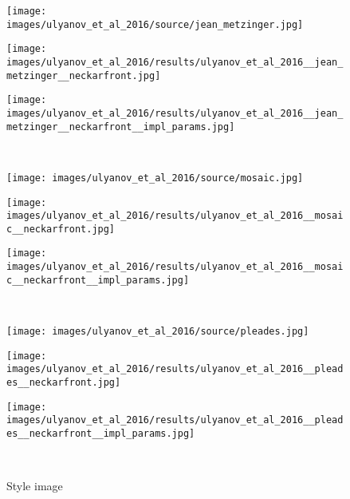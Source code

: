\begin{figure}[H]
\begin{minipage}[t]{0.24\textwidth}
		\texttt{[image: images/ulyanov\_et\_al\_2016/source/jean\_metzinger.jpg]}
	\end{minipage}
	\hfill%
	\begin{minipage}[t]{0.24\textwidth}
		\centering
		\texttt{[image: images/ulyanov\_et\_al\_2016/results/ulyanov\_et\_al\_2016\_\_jean\_metzinger\_\_neckarfront.jpg]}
	\end{minipage}
	\hfill%
	\begin{minipage}[t]{0.24\textwidth}
		\centering
		\texttt{[image: images/ulyanov\_et\_al\_2016/results/ulyanov\_et\_al\_2016\_\_jean\_metzinger\_\_neckarfront\_\_impl\_params.jpg]}
	\end{minipage}
	\hfill%
	\\
	\begin{minipage}[t]{0.24\textwidth}
		\centering
		\texttt{[image: images/ulyanov\_et\_al\_2016/source/mosaic.jpg]}
	\end{minipage}
	\hfill%
	\begin{minipage}[t]{0.24\textwidth}
		\centering
		\texttt{[image: images/ulyanov\_et\_al\_2016/results/ulyanov\_et\_al\_2016\_\_mosaic\_\_neckarfront.jpg]}
	\end{minipage}
	\hfill%
	\begin{minipage}[t]{0.24\textwidth}
		\centering
		\texttt{[image: images/ulyanov\_et\_al\_2016/results/ulyanov\_et\_al\_2016\_\_mosaic\_\_neckarfront\_\_impl\_params.jpg]}
	\end{minipage}
	\hfill%
	\\
	\begin{minipage}[t]{0.24\textwidth}
		\centering
		\texttt{[image: images/ulyanov\_et\_al\_2016/source/pleades.jpg]}
	\end{minipage}
	\hfill%
	\begin{minipage}[t]{0.24\textwidth}
		\centering
		\texttt{[image: images/ulyanov\_et\_al\_2016/results/ulyanov\_et\_al\_2016\_\_pleades\_\_neckarfront.jpg]}
	\end{minipage}
	\hfill%
	\begin{minipage}[t]{0.24\textwidth}
		\centering
		\texttt{[image: images/ulyanov\_et\_al\_2016/results/ulyanov\_et\_al\_2016\_\_pleades\_\_neckarfront\_\_impl\_params.jpg]}
	\end{minipage}
	\hfill%
	\\
	\begin{minipage}[t]{0.24\textwidth}
		\centering
		Style image
	\end{minipage}

\end{figure}
